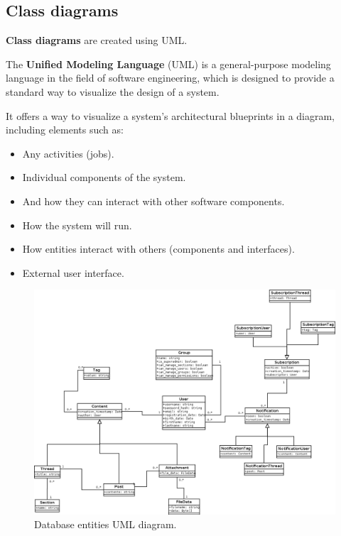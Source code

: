 \documentclass[12pt]{report}
\renewcommand\emph{\textbf}
\begin{document}
                    \newpage
                    \newpage

                \subsection{Class diagrams}

                    \emph{Class diagrams} are created using UML.

                    The \emph{Unified Modeling Language} (UML) is a general-purpose modeling language in the field of software engineering, which is designed to provide a standard way to visualize the design of a system.
                    
                    It offers a way to visualize a system's architectural blueprints in a diagram, including elements such as:

                    \begin{itemize}
                        \item Any activities (jobs).
                        \item Individual components of the system.
                        \item And how they can interact with other software components.
                        \item How the system will run.
                        \item How entities interact with others (components and interfaces).
                        \item External user interface.
                    \end{itemize}
                    
                    \begin{figure}[H]
                    \caption{Database entities UML diagram.}
                    \centering
                    \includegraphics[width=1\textwidth]{uml/umldb}
                    \end{figure}
\end{document}
